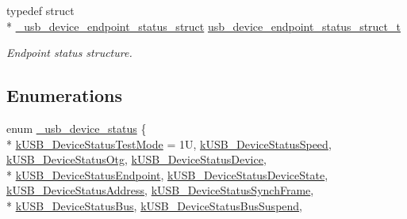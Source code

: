 \begin{DoxyCompactItemize}
typedef struct \\*
\hyperlink{struct__usb__device__endpoint__status__struct}{\-\_\-usb\-\_\-device\-\_\-endpoint\-\_\-status\-\_\-struct} \hyperlink{group__usb__device__driver_ga7db41d0acd6976fd4016b97f9dac0f51}{usb\-\_\-device\-\_\-endpoint\-\_\-status\-\_\-struct\-\_\-t}
\begin{DoxyCompactList}\small\item\em Endpoint status structure. \end{DoxyCompactList}\end{DoxyCompactItemize}
\subsection*{Enumerations}
\begin{DoxyCompactItemize}
\item 
enum \hyperlink{group__usb__device__driver_gad091bd3169bf45debbe8b5aba78d6091}{\-\_\-usb\-\_\-device\-\_\-status} \{ \\*
\hyperlink{group__usb__device__driver_ggad091bd3169bf45debbe8b5aba78d6091afa1c47d0cb4c8f751822e6204ceaca68}{k\-U\-S\-B\-\_\-\-Device\-Status\-Test\-Mode} = 1\-U, 
\hyperlink{group__usb__device__driver_ggad091bd3169bf45debbe8b5aba78d6091a01e79a57be59b44dc12a81a248d19b56}{k\-U\-S\-B\-\_\-\-Device\-Status\-Speed}, 
\hyperlink{group__usb__device__driver_ggad091bd3169bf45debbe8b5aba78d6091a4dc0830399c694c3af0f53eed326ba4d}{k\-U\-S\-B\-\_\-\-Device\-Status\-Otg}, 
\hyperlink{group__usb__device__driver_ggad091bd3169bf45debbe8b5aba78d6091a0c344a179ec60cfef88a020f01390447}{k\-U\-S\-B\-\_\-\-Device\-Status\-Device}, 
\\*
\hyperlink{group__usb__device__driver_ggad091bd3169bf45debbe8b5aba78d6091abfe4090beeb636774c9e18897fbffba2}{k\-U\-S\-B\-\_\-\-Device\-Status\-Endpoint}, 
\hyperlink{group__usb__device__driver_ggad091bd3169bf45debbe8b5aba78d6091ad704e2b6cb73fdbf0e60552a1da06ee3}{k\-U\-S\-B\-\_\-\-Device\-Status\-Device\-State}, 
\hyperlink{group__usb__device__driver_ggad091bd3169bf45debbe8b5aba78d6091a8ce5b187176d33cfb8f263e9c5392e6c}{k\-U\-S\-B\-\_\-\-Device\-Status\-Address}, 
\hyperlink{group__usb__device__driver_ggad091bd3169bf45debbe8b5aba78d6091a57984cab0b6b417c65a766c2772e5792}{k\-U\-S\-B\-\_\-\-Device\-Status\-Synch\-Frame}, 
\\*
\hyperlink{group__usb__device__driver_ggad091bd3169bf45debbe8b5aba78d6091a851aea79c4cc0cc44ffacf8dbc433017}{k\-U\-S\-B\-\_\-\-Device\-Status\-Bus}, 
\hyperlink{group__usb__device__driver_ggad091bd3169bf45debbe8b5aba78d6091aa77cc78d4d576415e4e878eedd9e81e5}{k\-U\-S\-B\-\_\-\-Device\-Status\-Bus\-Suspend}, 

\end{DoxyCompactItemize}
